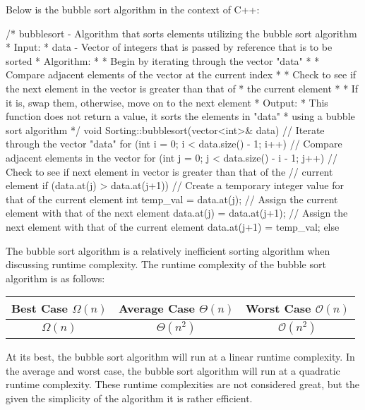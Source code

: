\begin{highlight}

Below is the bubble sort algorithm in the context of C++:

\begin{code}
/*  bubblesort - Algorithm that sorts elements utilizing the bubble sort algorithm
*   Input:
*     data - Vector of integers that is passed by reference that is to be sorted
*   Algorithm:
*     * Begin by iterating through the vector "data"
*     * Compare adjacent elements of the vector at the current index
*     * Check to see if the next element in the vector is greater than that of 
*       the current element
*       * If it is, swap them, otherwise, move on to the next element
*   Output:
*     This function does not return a value, it sorts the elements in "data" 
*     using a bubble sort algorithm
*/
void Sorting::bubblesort(vector<int>& data){
// Iterate through the vector "data"
for (int i = 0; i < data.size() - 1; i++) {
    // Compare adjacent elements in the vector
    for (int j = 0; j < data.size() - i - 1; j++) {
        // Check to see if next element in vector is greater than that of the 
        // current element
        if (data.at(j) > data.at(j+1)) {
            // Create a temporary integer value for that of the current element
            int temp_val = data.at(j);
            // Assign the current element with that of the next element
            data.at(j) = data.at(j+1);
            // Assign the next element with that of the current element
            data.at(j+1) = temp_val;
        }
        else {}
        }
    }
}
\end{code}

The bubble sort algorithm is a relatively inefficient sorting algorithm when discussing runtime complexity. The runtime complexity of the bubble sort algorithm is as follows:

\begin{center}
    \begin{tabular}{|c|c|c|}
        \hline \textbf{Best Case $\Omega(n)$} & \textbf{Average Case $\Theta(n)$} & \textbf{Worst Case $\mathcal{O}(n)$} \\ \hline
        $\Omega(n)$ & $\Theta(n^2)$ & $\mathcal{O}(n^2)$ \\ \hline
    \end{tabular}
\end{center}

\noindent At its best, the bubble sort algorithm will run at a linear runtime complexity. In the average and worst case, the bubble sort algorithm will run at a quadratic runtime complexity. These runtime complexities are not considered great, but the given the simplicity of the algorithm it is rather efficient.

\end{highlight}

